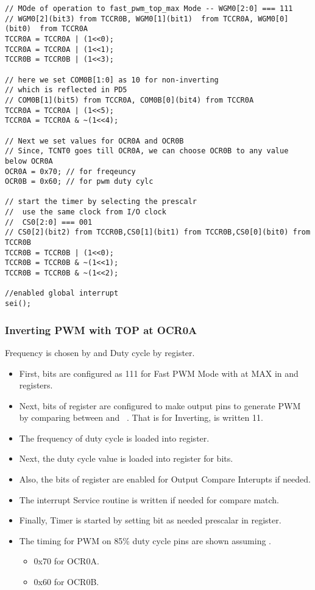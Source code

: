 \begin{verbatim}
// MOde of operation to fast_pwm_top_max Mode -- WGM0[2:0] === 111
// WGM0[2](bit3) from TCCR0B, WGM0[1](bit1)  from TCCR0A, WGM0[0](bit0)  from TCCR0A
TCCR0A = TCCR0A | (1<<0);
TCCR0A = TCCR0A | (1<<1);
TCCR0B = TCCR0B | (1<<3);	

// here we set COM0B[1:0] as 10 for non-inverting
// which is reflected in PD5
// COM0B[1](bit5) from TCCR0A, COM0B[0](bit4) from TCCR0A
TCCR0A = TCCR0A | (1<<5);
TCCR0A = TCCR0A & ~(1<<4);

// Next we set values for OCR0A and OCR0B
// Since, TCNT0 goes till OCR0A, we can choose OCR0B to any value below OCR0A
OCR0A = 0x70; // for freqeuncy
OCR0B = 0x60; // for pwm duty cylc

// start the timer by selecting the prescalr
//  use the same clock from I/O clock
//  CS0[2:0] === 001
// CS0[2](bit2) from TCCR0B,CS0[1](bit1) from TCCR0B,CS0[0](bit0) from TCCR0B
TCCR0B = TCCR0B | (1<<0);
TCCR0B = TCCR0B & ~(1<<1);
TCCR0B = TCCR0B & ~(1<<2);

//enabled global interrupt
sei();
\end{verbatim}

\subsubsection{Inverting PWM with TOP at  OCR0A}
\quad Frequency is chosen by  and Duty cycle by  register.
\begin{itemize}
    \item First,  bits are configured as 111 for Fast PWM Mode with  at MAX in  and  registers.
    \item Next,  bits of  register are configured to make output  pins to generate PWM by comparing between  and \ . That is for Inverting,  is written 11.
    \item The frequency of duty cycle is loaded into  register.
    \item Next, the duty cycle value is loaded into  register for  bits.
    \item Also, the  bits of  register  are enabled for Output Compare Interupts if needed.
    \item The interrupt Service routine is written if needed for compare match.
    \item Finally, Timer is started by setting  bit as needed prescalar in  register.
    \item The timing for PWM on 85\% duty cycle  pins are shown assuming .
    \begin{itemize}
        \item 0x70 for OCR0A.
        \item 0x60 for OCR0B.
    \end{itemize}
\end{itemize}


